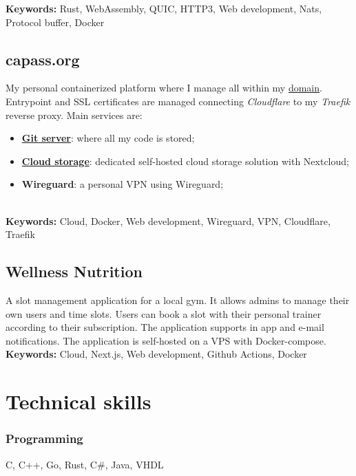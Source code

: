 \documentclass[11pt,a4paper]{article}
\begin{document}
  \textbf{Keywords:} Rust, WebAssembly, QUIC, HTTP3, Web development, Nats, Protocol buffer, Docker 
  
  \subsection{capass.org \href{https://github.com/alarmfox/personal-cloud}{\faGithub} \href{https://git.capass.org}{\faGit} \href{https://cloud.capass.org}{\faCloud}}
  My personal containerized platform where I manage all within my \href{https://capass.org}{domain}. Entrypoint and SSL certificates are managed connecting \textit{Cloudflare} to my \textit{Traefik} reverse proxy. Main services are:
  \begin{itemize}
    \item \href{https://git.capass.org}{\textbf{Git server}}: where all my code is stored;
    \item \href{https://cloud.capass.org}{\textbf{Cloud storage}}: dedicated self-hosted cloud storage solution with Nextcloud;
    \item \textbf{Wireguard}: a personal VPN using Wireguard;
  \end{itemize}\\
  
  \textbf{Keywords:} Cloud, Docker, Web development, Wireguard, VPN, Cloudflare, Traefik

  \subsection{Wellness Nutrition \href{https://github.com/alarmfox/wellness-nutrition}{\faGithub} \href{https://wellnessdemo.capass.org}{\faLaptopCode}}
  A slot management application for a local gym. It allows admins to manage their own users and time slots. Users can book a slot with their personal trainer according to their subscription. The application supports in app and e-mail notifications. The application is self-hosted on a VPS with Docker-compose.\\

  \textbf{Keywords:} Cloud, Next.js, Web development, Github Actions, Docker

  \section{Technical skills}
  \subsubsection{Programming}
  C, C++, Go, Rust, C\#, Java, VHDL
\end{document}
